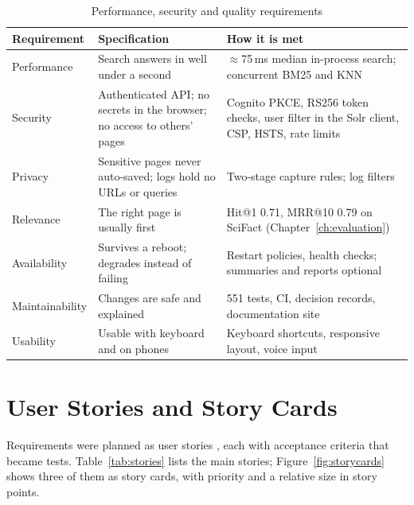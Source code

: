 \begin{table}[!htbp]
\centering
\small
\begin{tabularx}{\textwidth}{>{\raggedright\arraybackslash}p{} L L}
\toprule
\textbf{Requirement} & \textbf{Specification} & \textbf{How it is met} \\
\midrule
Performance & Search answers in well under a second & $\approx$75\,ms median in-process search; concurrent BM25 and KNN \\
Security & Authenticated API; no secrets in the browser; no access to others' pages & Cognito PKCE, RS256 token checks, user filter in the Solr client, CSP, HSTS, rate limits \\
Privacy & Sensitive pages never auto-saved; logs hold no URLs or queries & Two-stage capture rules; log filters \\
Relevance & The right page is usually first & Hit@1 0.71, MRR@10 0.79 on SciFact (Chapter~\ref{ch:evaluation}) \\
Availability & Survives a reboot; degrades instead of failing & Restart policies, health checks; summaries and reports optional \\
Maintainability & Changes are safe and explained & 551 tests, CI, decision records, documentation site \\
Usability & Usable with keyboard and on phones & Keyboard shortcuts, responsive layout, voice input \\
\bottomrule
\end{tabularx}
\caption{Performance, security and quality requirements}
\label{tab:nfr}
\end{table}

\section{User Stories and Story Cards}

Requirements were planned as user stories \cite{sommerville2016se}, each with
acceptance criteria that became tests. Table~\ref{tab:stories} lists the main
stories; Figure~\ref{fig:storycards} shows three of them as story cards, with
priority and a relative size in story points.

